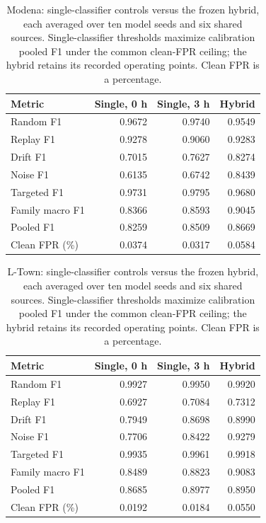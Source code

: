 \begin{table}[!htbp]
\centering\small
\caption[Single-classifier comparison on Modena]{Modena: single-classifier controls versus the frozen hybrid, each averaged over ten model seeds and six shared sources. Single-classifier thresholds maximize calibration pooled F1 under the common clean-FPR ceiling; the hybrid retains its recorded operating points. Clean FPR is a percentage.}
\label{tab:singlemodena}
\begin{tabular}{@{}lrrr@{}}
\toprule
Metric & Single, 0 h & Single, 3 h & Hybrid\\
\midrule
Random F1 & 0.9672 & 0.9740 & 0.9549\\
Replay F1 & 0.9278 & 0.9060 & 0.9283\\
Drift F1 & 0.7015 & 0.7627 & 0.8274\\
Noise F1 & 0.6135 & 0.6742 & 0.8439\\
Targeted F1 & 0.9731 & 0.9795 & 0.9680\\
Family macro F1 & 0.8366 & 0.8593 & 0.9045\\
Pooled F1 & 0.8259 & 0.8509 & 0.8669\\
Clean FPR (\%) & 0.0374 & 0.0317 & 0.0584\\
\bottomrule
\end{tabular}
\end{table}
\FloatBarrier

\begin{table}[!htbp]
\centering\small
\caption[Single-classifier comparison on L-Town]{L-Town: single-classifier controls versus the frozen hybrid, each averaged over ten model seeds and six shared sources. Single-classifier thresholds maximize calibration pooled F1 under the common clean-FPR ceiling; the hybrid retains its recorded operating points. Clean FPR is a percentage.}
\label{tab:singleltown}
\begin{tabular}{@{}lrrr@{}}
\toprule
Metric & Single, 0 h & Single, 3 h & Hybrid\\
\midrule
Random F1 & 0.9927 & 0.9950 & 0.9920\\
Replay F1 & 0.6927 & 0.7084 & 0.7312\\
Drift F1 & 0.7949 & 0.8698 & 0.8990\\
Noise F1 & 0.7706 & 0.8422 & 0.9279\\
Targeted F1 & 0.9935 & 0.9961 & 0.9918\\
Family macro F1 & 0.8489 & 0.8823 & 0.9083\\
Pooled F1 & 0.8685 & 0.8977 & 0.8950\\
Clean FPR (\%) & 0.0192 & 0.0184 & 0.0550\\
\bottomrule
\end{tabular}
\end{table}
\FloatBarrier

\FloatBarrier

